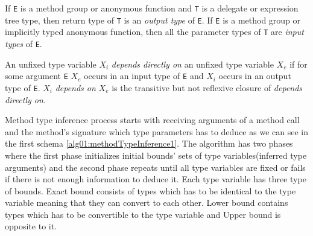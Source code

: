 \begin{defn}
If \texttt{E} is a method group or anonymous function and \texttt{T} is a delegate or expression tree type, then return type of \texttt{T} is an \emph{output type} of \texttt{E}.
If \texttt{E} is a method group or implicitly typed anonymous function, then all the parameter types of \texttt{T} are \emph{input types} of \texttt{E}. 
\end{defn}
\par
\begin{defn}[Dependence]
An unfixed type variable \texttt{$X_i$} \emph{depends directly on} an unfixed type variable \texttt{$X_e$} if for some argument \texttt{E} \texttt{$X_e$} occurs in an input type of \texttt{E} and \texttt{$X_i$} occurs in an output type of \texttt{E}.
\texttt{$X_i$} \emph{depends on} \texttt{$X_e$} is the transitive but not reflexive closure of \emph{depends directly on}.
\end{defn}
\par
{}
Method type inference process starts with receiving arguments of a method call and the method's signature which type parameters has to deduce as we can see in the first schema \ref{alg01:methodTypeInference1}.
The algorithm has two phases where the first phase initializes initial bounds' sets of type variables(inferred type arguments) and the second phase repeats until all type variables are fixed or fails if there is not enough information to deduce it.
Each type variable has three type of bounds. 
Exact bound consists of types which has to be identical to the type variable meaning that they can convert to each other.
Lower bound contains types which has to be convertible to the type variable and Upper bound is opposite to it.
\par
